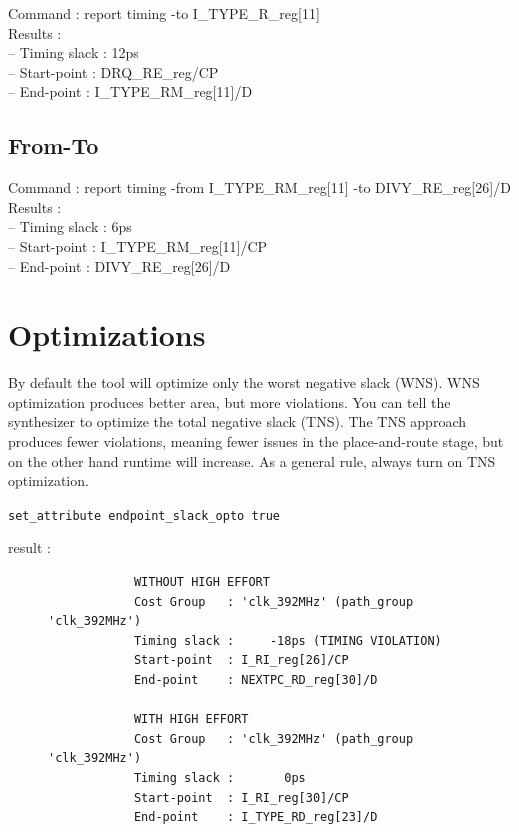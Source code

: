 \documentclass[11pt,a4paper,sans,dvipsnames]{report}
\begin{document}
	Command : {\colorbox{Gray!50}{\textcolor{RubineRed}{report timing -to I\_TYPE\_R\_reg[11]}}}\\

	Results :\\
	-- Timing slack :     12ps \\
	-- Start-point  : DRQ\_RE\_reg/CP\\
	-- End-point    : I\_TYPE\_RM\_reg[11]/D\\

	\subsection{From-To}

	Command : {\colorbox{Gray!50}{\textcolor{RubineRed}{report timing -from I\_TYPE\_RM\_reg[11] -to DIVY\_RE\_reg[26]/D}}}\\

	Results :\\
	-- Timing slack :       6ps\\ 
	-- Start-point  : I\_TYPE\_RM\_reg[11]/CP\\
	-- End-point    : DIVY\_RE\_reg[26]/D\\


	\newpage
	\section{Optimizations}
	By default the tool will optimize only the worst negative slack (WNS). WNS optimization produces better area, but more violations. You can tell the synthesizer to optimize the total negative slack (TNS). The TNS approach produces fewer violations, meaning fewer issues in the place-and-route stage, but on the other hand runtime will increase. As a general rule, always turn on TNS optimization.

	\texttt{set\_attribute endpoint\_slack\_opto true}

	result :
	\begin{figure}[h!]
		\centering
		\begin{lstlisting}
			WITHOUT HIGH EFFORT
			Cost Group   : 'clk_392MHz' (path_group 'clk_392MHz')
			Timing slack :     -18ps (TIMING VIOLATION)
			Start-point  : I_RI_reg[26]/CP
			End-point    : NEXTPC_RD_reg[30]/D

			WITH HIGH EFFORT
			Cost Group   : 'clk_392MHz' (path_group 'clk_392MHz')
			Timing slack :       0ps 
			Start-point  : I_RI_reg[30]/CP
			End-point    : I_TYPE_RD_reg[23]/D
		\end{lstlisting}
	\end{figure}
\end{document}

